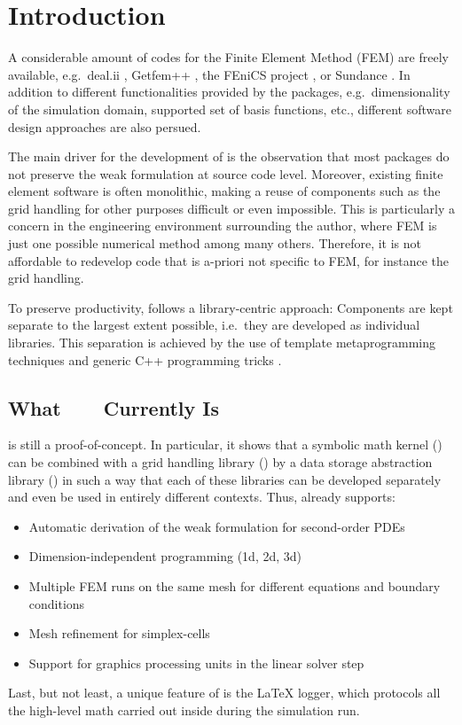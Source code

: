 
\chapter*{Introduction}    \label{intro}

A considerable amount of codes for the Finite Element Method (FEM) are freely available, e.g.~deal.ii \cite{deal.II}, Getfem++ \cite{Getfem++}, the FEniCS project \cite{FEniCS}, or Sundance \cite{Sundance}.
In addition to different functionalities provided by the packages, e.g.~dimensionality of the simulation domain, supported set of basis functions, etc., different software design approaches are also persued. 

The main driver for the development of {\ViennaFEM} is the observation that most packages do not preserve the weak formulation at source code level.
Moreover, existing finite element software is often monolithic, making a reuse of components such as the grid handling for other purposes difficult or even impossible.
This is particularly a concern in the engineering environment surrounding the author, where FEM is just one possible numerical method among many others.
Therefore, it is not affordable to redevelop code that is a-priori not specific to FEM, for instance the grid handling.

To preserve productivity, {\ViennaFEM} follows a library-centric approach: Components are kept separate to the largest extent possible, i.e.~they are developed as individual libraries.
This separation is achieved by the use of template metaprogramming techniques \cite{Vandevoorde:CppTemplates} and generic C++ programming tricks \cite{Alexandrescu:ModernCpp}.

\section*{What\ \ {\ViennaFEM}\ \ Currently Is}
{\ViennaFEMversion} is still a proof-of-concept. In particular, it shows that a symbolic math kernel (\ViennaMath) can be combined with a grid handling library (\ViennaGrid) by a data storage abstraction library (\ViennaData) in such a way that each of these libraries can be developed separately and even be used in entirely different contexts.
Thus, {\ViennaFEMversion} already supports:
\begin{itemize}
 \item Automatic derivation of the weak formulation for second-order PDEs
 \item Dimension-independent programming (1d, 2d, 3d)
 \item Multiple FEM runs on the same mesh for different equations and boundary conditions
 \item Mesh refinement for simplex-cells
 \item Support for graphics processing units in the linear solver step
\end{itemize}
Last, but not least, a unique feature of {\ViennaFEM} is the {\LaTeX} logger, which protocols all the high-level math carried out inside {\ViennaFEM} during the simulation run.

